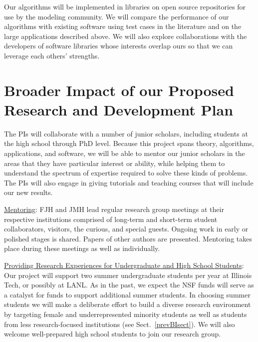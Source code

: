 \documentclass[11pt]{NSFamsart}
\newcommand{\Upara}[1]{\noindent\underline{\upshape #1}:}
\begin{document}
Our algorithms will be implemented in libraries on open source repositories for use by the modeling community.  We will compare the performance of our algorithms with existing software using test cases in the literature and on the large applications described above.  We will also explore collaborations with the developers of software libraries whose interests overlap ours so that we can leverage each others' strengths.


\section{Broader Impact of our Proposed Research and Development Plan}

The PIs will collaborate with a number of junior scholars, including students at the high school through PhD level.  Because this project spans theory, algorithms, applications, and software, we will be able to mentor our junior scholars in the areas that they have particular interest or ability, while helping them to understand the spectrum of expertise required to solve these kinds of problems.  The PIs will also engage in giving tutorials and teaching courses that will include our new results.

\Upara{Mentoring}
FJH and JMH lead regular research group meetings at their respective institutions comprised of long-term and short-term student 
collaborators, visitors, the curious, and special guests.  Ongoing work in early or polished stages is shared.  Papers of other authors are presented.  Mentoring takes place during these meetings as well as individually.

\Upara{Providing Research Experiences for Undergraduate and High School Students} 
Our project will support two summer undergraduate students per year at Illinois Tech, or possibly at LANL. As in the past, we expect the NSF funds will serve as a catalyst for funds to 
support additional summer students. In choosing summer students we will make a deliberate effort to 
build 
a diverse research environment by targeting female and underrepresented minority students as well 
as students from less research-focused institutions (see Sect.~\ref{prevBIsect}). We will also 
welcome well-prepared high school students to join our research group.
\end{document}
